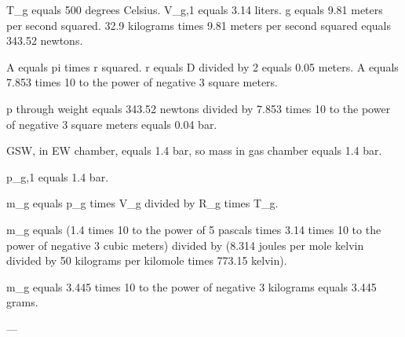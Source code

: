T_g equals 500 degrees Celsius.  
V_g,1 equals 3.14 liters.  
g equals 9.81 meters per second squared.  
32.9 kilograms times 9.81 meters per second squared equals 343.52 newtons.  

A equals pi times r squared. r equals D divided by 2 equals 0.05 meters.  
A equals 7.853 times 10 to the power of negative 3 square meters.  

p through weight equals 343.52 newtons divided by 7.853 times 10 to the power of negative 3 square meters equals 0.04 bar.  

GSW, in EW chamber, equals 1.4 bar, so mass in gas chamber equals 1.4 bar.  

p_g,1 equals 1.4 bar.  

m_g equals p_g times V_g divided by R_g times T_g.  

m_g equals (1.4 times 10 to the power of 5 pascals times 3.14 times 10 to the power of negative 3 cubic meters) divided by (8.314 joules per mole kelvin divided by 50 kilograms per kilomole times 773.15 kelvin).  

m_g equals 3.445 times 10 to the power of negative 3 kilograms equals 3.445 grams.  

---